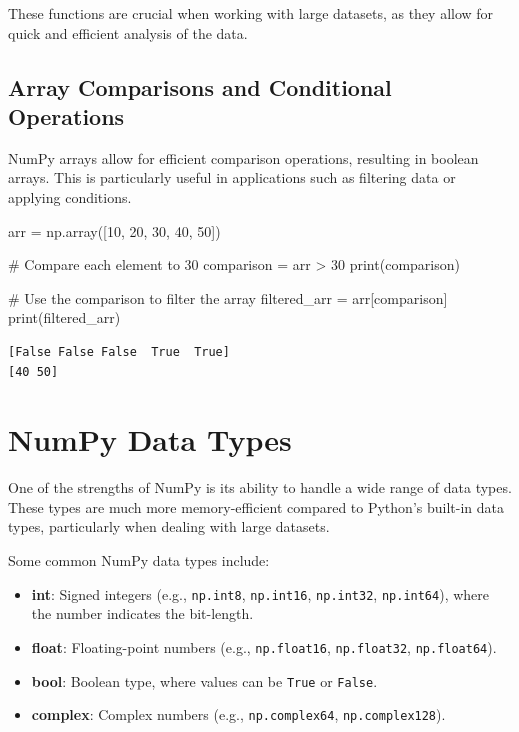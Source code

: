 \documentclass[
  letterpaper,
  DIV=11,
  numbers=noendperiod]{scrreprt}
\newenvironment{Shaded}{\begin{snugshade}}{\end{snugshade}}
\newcommand{\BuiltInTok}[1]{\textcolor[rgb]{0.00,0.23,0.31}{#1}}
\newcommand{\CommentTok}[1]{\textcolor[rgb]{0.37,0.37,0.37}{#1}}
\newcommand{\DecValTok}[1]{\textcolor[rgb]{0.68,0.00,0.00}{#1}}
\newcommand{\NormalTok}[1]{\textcolor[rgb]{0.00,0.23,0.31}{#1}}
\newcommand{\OperatorTok}[1]{\textcolor[rgb]{0.37,0.37,0.37}{#1}}
\providecommand{\tightlist}{%
  \setlength{\itemsep}{0pt}\setlength{\parskip}{0pt}}\usepackage{longtable,booktabs,array}
\begin{document}
These functions are crucial when working with large datasets, as they
allow for quick and efficient analysis of the data.

\hypertarget{array-comparisons-and-conditional-operations}{%
\subsection{Array Comparisons and Conditional
Operations}\label{array-comparisons-and-conditional-operations}}

NumPy arrays allow for efficient comparison operations, resulting in
boolean arrays. This is particularly useful in applications such as
filtering data or applying conditions.

\begin{Shaded}
\begin{Highlighting}[]
\NormalTok{arr }\OperatorTok{=}\NormalTok{ np.array([}\DecValTok{10}\NormalTok{, }\DecValTok{20}\NormalTok{, }\DecValTok{30}\NormalTok{, }\DecValTok{40}\NormalTok{, }\DecValTok{50}\NormalTok{])}

\CommentTok{\# Compare each element to 30}
\NormalTok{comparison }\OperatorTok{=}\NormalTok{ arr }\OperatorTok{\textgreater{}} \DecValTok{30}
\BuiltInTok{print}\NormalTok{(comparison)  }

\CommentTok{\# Use the comparison to filter the array}
\NormalTok{filtered\_arr }\OperatorTok{=}\NormalTok{ arr[comparison]}
\BuiltInTok{print}\NormalTok{(filtered\_arr)  }
\end{Highlighting}
\end{Shaded}

\begin{verbatim}
[False False False  True  True]
[40 50]
\end{verbatim}

\hypertarget{numpy-data-types}{%
\section{NumPy Data Types}\label{numpy-data-types}}

One of the strengths of NumPy is its ability to handle a wide range of
data types. These types are much more memory-efficient compared to
Python's built-in data types, particularly when dealing with large
datasets.

Some common NumPy data types include:

\begin{itemize}
\tightlist
\item
  \textbf{int}: Signed integers (e.g., \texttt{np.int8},
  \texttt{np.int16}, \texttt{np.int32}, \texttt{np.int64}), where the
  number indicates the bit-length.
\item
  \textbf{float}: Floating-point numbers (e.g., \texttt{np.float16},
  \texttt{np.float32}, \texttt{np.float64}).
\item
  \textbf{bool}: Boolean type, where values can be \texttt{True} or
  \texttt{False}.
\item
  \textbf{complex}: Complex numbers (e.g., \texttt{np.complex64},
  \texttt{np.complex128}).
\end{itemize}
\end{document}
